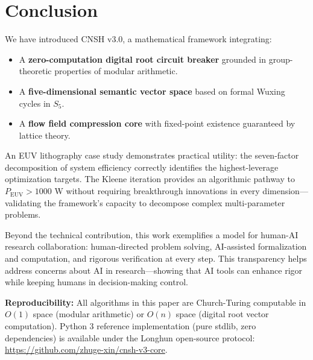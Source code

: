 \documentclass[twocolumn]{article}
\begin{document}
\section{Conclusion}

We have introduced CNSH v3.0, a mathematical framework integrating:
\begin{itemize}
  \item A \textbf{zero-computation digital root circuit breaker} grounded in group-theoretic properties of modular arithmetic.
  \item A \textbf{five-dimensional semantic vector space} based on formal Wuxing cycles in $S_5$.
  \item A \textbf{flow field compression core} with fixed-point existence guaranteed by lattice theory.
\end{itemize}

An EUV lithography case study demonstrates practical utility: the seven-factor decomposition of system efficiency correctly identifies the highest-leverage optimization targets. The Kleene iteration provides an algorithmic pathway to $P_{\text{EUV}} > 1000$ W without requiring breakthrough innovations in every dimension—validating the framework's capacity to decompose complex multi-parameter problems.

Beyond the technical contribution, this work exemplifies a model for human-AI research collaboration: human-directed problem solving, AI-assisted formalization and computation, and rigorous verification at every step. This transparency helps address concerns about AI in research—showing that AI tools can enhance rigor while keeping humans in decision-making control.

\textbf{Reproducibility:} All algorithms in this paper are Church-Turing computable in $O(1)$ space (modular arithmetic) or $O(n)$ space (digital root vector computation). Python 3 reference implementation (pure stdlib, zero dependencies) is available under the Longhun open-source protocol: \url{https://github.com/zhuge-xin/cnsh-v3-core}.
\end{document}
